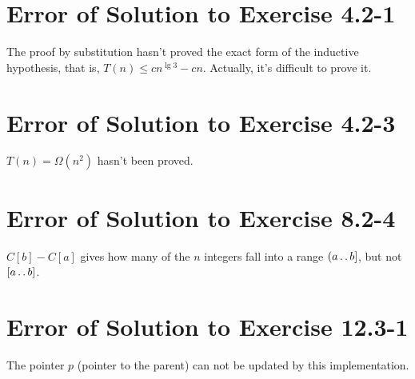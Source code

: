 \documentclass[a4paper, fleqn]{article}
\begin{document}
\section*{Error of Solution to Exercise 4.2-1}

The proof by substitution hasn't proved the exact form of the inductive 
hypothesis, that is, $T(n) \leq c n^{\lg3} - cn$. Actually, it's difficult to 
prove it.



\section*{Error of Solution to Exercise 4.2-3}

$T(n) = \Omega(n^2)$ hasn't been proved.



\section*{Error of Solution to Exercise 8.2-4}

$C[b] - C[a]$ gives how many of the $n$ integers fall into a range $(a
\mathinner{\ldotp\ldotp} b]$, but not $[a \mathinner{\ldotp\ldotp} b]$.



\section*{Error of Solution to Exercise 12.3-1}
The pointer $p$ (pointer to the parent) can not be updated by this
implementation.
\end{document}
